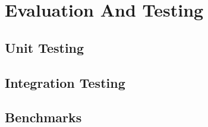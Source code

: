 \chapter{Evaluation And Testing} \label{evalandtesting}
\cite{komathukattil_evaluating_nodate}
\section{Unit Testing}
\section{Integration Testing}
\section{Benchmarks}

